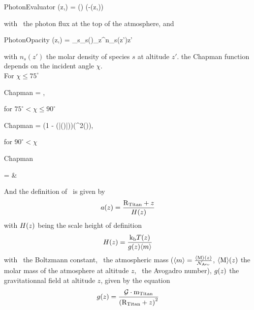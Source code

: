 \begin{equationCode}{PhotonEvaluator}
\fhv(z,\lambda) = \fhvtop(\lambda) \exp\left(-\tau(z,\lambda)\right)
\end{equationCode}
with \fhvtop\ the photon flux at the top of the atmosphere, and
\begin{equationCode}{PhotonOpacity}
\tau(z,\lambda) = \chapman\sum_s\sigma_s(\lambda)\int_z^\infty n_s(z')\dd z'
\end{equationCode}
with $n_s(z')$ the molar density of species $s$ at altitude $z'$.
the Chapman function depends on the
incident angle $\chi$.\\
For $\chi \le 75^\circ$
\begin{equationCode}{Chapman}
\chapman =  ,
\end{equationCode}
for $75^\circ < \chi \le 90^\circ$
\begin{equationCode}{Chapman}
\chapman =  
                \left(1 - \erf\left(|\cos(\chi)|\right)\right)\exp\left(\cos^2(\chi)\right),
\end{equationCode}
for $90^\circ < \chi$
\begin{equationCode}{Chapman}
\begin{split}
\chapman = & \sqrt{2\pi \x}
\end{split}
\end{equationCode}
And the definition of \x\ is given by
\begin{equation}
a(z) = \frac{\text{R}_\text{Titan} + z}{H(z)}
\end{equation}
with $H(z)$ being the scale height of definition
\begin{equation}
H(z) = \frac{\text{k}_\text{b} T(z)}{g(z)\langle m\rangle}
\label{Titan:scale_height}
\end{equation}
with \kb\ the Boltzmann constant, 
\mean{\mass}\ the atmospheric mass ($\langle m\rangle = \frac{\langle\text{M}\rangle(z)}{\mathcal{N}_\text{Avo}}$, 
$\langle\text{M}\rangle(z)$ the molar mass of the atmosphere at altitude $z$,
\Nav\ the Avogadro number), 
$g(z)$ the gravitationnal field at altitude $z$, given by the equation
\begin{equation}
g(z) = \frac{\mathcal{G}\cdot\text{m}_\text{Titan}}{\left(\text{R}_\text{Titan} + z\right)^2}
\label{gfield}
\end{equation}

